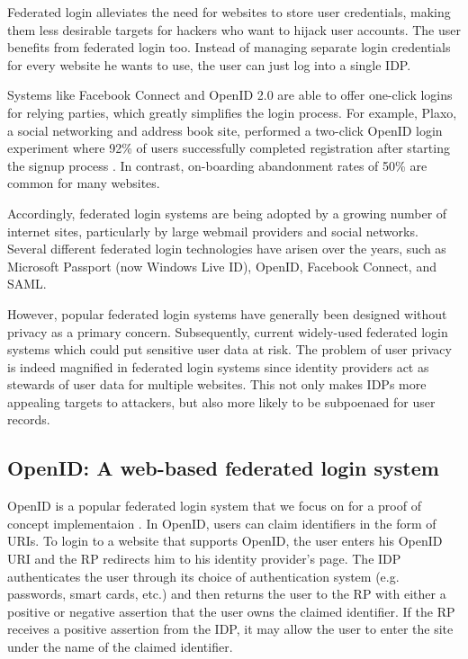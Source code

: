 \documentclass{llncs}
\begin{document}
Federated login alleviates the need for websites to store user
credentials, making them less desirable targets for hackers who want
to hijack user accounts. The user benefits from federated login too.
Instead of managing separate login credentials for every website he
wants to use, the user can just log into a single IDP.

Systems like Facebook Connect and OpenID 2.0 are able to offer
one-click logins for relying parties, which greatly simplifies the
login process. For example, Plaxo, a social networking and address
book site, performed a two-click OpenID login experiment where 92\% of
users successfully completed registration after starting the signup
process \cite{Ki09}. In contrast, on-boarding abandonment rates of
50\% are common for many websites.

Accordingly, federated login systems are being adopted by a growing
number of internet sites, particularly by large webmail providers and
social networks.  Several different federated login technologies have
arisen over the years, such as Microsoft Passport (now Windows Live
ID), OpenID, Facebook Connect, and SAML.

However, popular federated login systems have generally been designed
without privacy as a primary concern. Subsequently, current
widely-used federated login systems which could put sensitive user
data at risk. The problem of user privacy is indeed magnified in
federated login systems since identity providers act as stewards of
user data for multiple websites. This not only makes IDPs more
appealing targets to attackers, but also more likely to be subpoenaed
for user records.

\subsection{OpenID: A web-based federated login system}

OpenID is a popular federated login system that we focus on for a
proof of concept implementaion \cite{OID}. In OpenID, users can claim
identifiers in the form of URIs. To login to a website that supports
OpenID, the user enters his OpenID URI and the RP redirects him to
his identity provider's page. The IDP authenticates the user through
its choice of authentication system (e.g. passwords, smart cards,
etc.) and then returns the user to the RP with either a positive or
negative assertion that the user owns the claimed identifier. If the
RP receives a positive assertion from the IDP, it may allow the user
to enter the site under the name of the claimed identifier.
\end{document}
